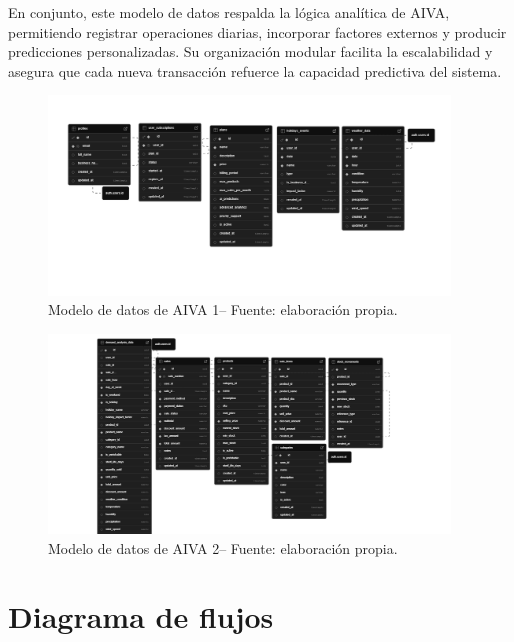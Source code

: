 En conjunto, este modelo de datos respalda la lógica analítica de AIVA, permitiendo registrar operaciones diarias, incorporar factores externos y producir predicciones personalizadas. Su organización modular facilita la escalabilidad y asegura que cada nueva transacción refuerce la capacidad predictiva del sistema.

\begin{figure}[!htbp]
  \centering
  \includegraphics[width=0.95\textwidth]{images/ArquitecturaDB1.png} %
  \caption{Modelo de datos de AIVA 1-- Fuente: elaboración propia.}
  \label{fig:arquitectura-db}
\end{figure}
\vspace{1cm}

\begin{figure}[!htbp]
    \centering
    \includegraphics[width=0.95\textwidth]{images/ArquitecturaDB2.png} %
    \caption{Modelo de datos de AIVA 2-- Fuente: elaboración propia.}
    \label{fig:arquitectura-db2}
  \end{figure}
  \vspace{2cm}


\vspace{1cm}
\section{Diagrama de flujos}

